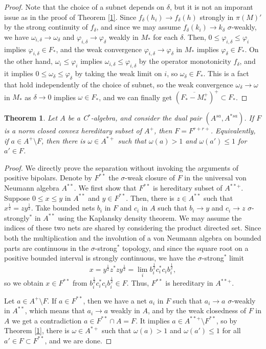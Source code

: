 \documentclass[noamsfonts,a4paper,10pt]{amsart}
\theoremstyle{plain}
\newtheorem{thm}{Theorem}[section]
\theoremstyle{definition}
\theoremstyle{remark}
\begin{document}
\begin{proof}
Note that the choice of a subnet depends on $\delta$, but it is not an imporant issue as in the proof of Theorem \ref{1}.
Since $f_\delta(h_i)\to f_\delta(h)$ strongly in $\pi(M)'$ by the strong continuity of $f_\delta$, and since we may assume $f_\delta(k_i)\to k_\delta$ $\sigma$-weakly, we have $\omega_{i,\delta}\to\omega_\delta$ and $\varphi_{i,\delta}\to\varphi_\delta$ weakly in $M_*$ for each $\delta$.
Then, $0\le\varphi_{i,\delta}\le\varphi_i$ implies $\varphi_{i,\delta}\in F_*$, and the weak convergence $\varphi_{i,\delta}\to\varphi_\delta$ in $M_*$ implies $\varphi_\delta\in F_*$.
On the other hand, $\omega_i\le\varphi_i$ implies $\omega_{i,\delta}\le\varphi_{i,\delta}$ by the operator monotonicity $f_\delta$, and it implies $0\le\omega_\delta\le\varphi_\delta$ by taking the weak limit on $i$, so $\omega_\delta\in F_*$.
This is a fact that hold independently of the choice of subnet, so the weak convergence $\omega_\delta\to\omega$ in $M_*$ as $\delta\to0$ implies $\omega\in F_*$, and we can finally get $(\overline{F_*-M_*^+})^+\subset F_*$.
\end{proof}



\begin{thm}
Let $A$ be a C$^*$-algebra, and consider the dual pair $(A^{sa},A^{*sa})$.
If $F$ is a norm closed convex hereditary subset of $A^+$, then $F=F^{r+r+}$.
Equivalently, if $a\in A^+\setminus F$, then there is $\omega\in A^{*+}$ such that $\omega(a)>1$ and $\omega(a')\le1$ for $a'\in F$.
\end{thm}
\begin{proof}
We directly prove the separation without invoking the arguments of positive bipolars.
Denote by $F^{**}$ the $\sigma$-weak closure of $F$ in the universal von Neumann algebra $A^{**}$.
We first show that $F^{**}$ is hereditary subset of $A^{**+}$.
Suppose $0\le x\le y$ in $A^{**}$ and $y\in F^{**}$.
Then, there is $z\in A^{**}$ such that $x^{\frac12}=zy^{\frac12}$.
Take bounded nets $b_i$ in $F$ and $c_i$ in $A$ such that $b_i\to y$ and $c_i\to z$ $\sigma$-strongly$^*$ in $A^{**}$ using the Kaplansky density theorem.
We may assume the indices of these two nets are shared by considering the product directed set.
Since both the multiplication and the involution of a von Neumann algebra on bounded parts are continuous in the $\sigma$-strong$^*$ topology, and since the square root on a positive bounded interval is strongly continuous, we have the $\sigma$-strong$^*$ limit
\[x=y^{\frac12}z^*zy^{\frac12}=\lim_ib_i^{\frac12}c_i^*c_ib_i^{\frac12},\]
so we obtain $x\in F^{**}$ from $b_i^{\frac12}c_i^*c_ib_i^{\frac12}\in F$.
Thus, $F^{**}$ is hereditary in $A^{**+}$.

Let $a\in A^+\setminus F$.
If $a\in F^{**}$, then we have a net $a_i$ in $F$ such that $a_i\to a$ $\sigma$-weakly in $A^{**}$, which means that $a_i\to a$ weakly in $A$, and by the weak closedness of $F$ in $A$ we get a contradiction $a\in F^{**}\cap A=F$.
It implies $a\in A^{**+}\setminus F^{**}$, so by Theorem \ref{1}, there is $\omega\in A^{*+}$ such that $\omega(a)>1$ and $\omega(a')\le1$ for all $a'\in F\subset F^{**}$, and we are done.
\end{proof}
\end{document}
